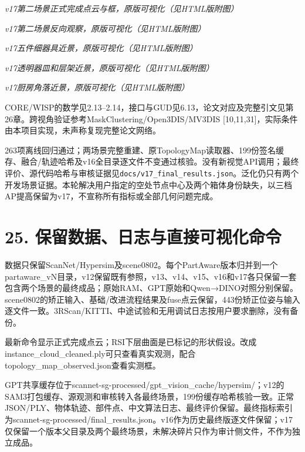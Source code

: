 \documentclass[UTF8,fontset=fandol]{ctexart}
\begin{document}
\textit{v17第二场景正式完成点云与框，原版可视化（见HTML版附图）}



\textit{v17第二场景反向观察，原版可视化（见HTML版附图）}



\textit{v17五件细器具近景，原版可视化（见HTML版附图）}



\textit{v17透明器皿和层架近景，原版可视化（见HTML版附图）}



\textit{v17厨房角落近景，原版可视化（见HTML版附图）}



CORE/WISP的数学见2.13–2.14，接口与GUD见6.13，论文对应及完整引文见第26章。跨视角验证参考MaskClustering/Open3DIS/MV3DIS [10,11,31]，实际条件由本项目实现，未声称复现完整论文网络。



263项离线回归通过；两场景完整重建、原TopologyMap读取器、199份签名缓存、融合/轨迹哈希及v16全目录逐文件不变通过核验。没有新视觉API调用；最终评价、源代码哈希与审核证据见\texttt{docs/\allowbreak{}v17\_\allowbreak{}final\_\allowbreak{}results.\allowbreak{}json}。泛化仍只有两个开发场景证据。本轮解决用户指定的空处节点中心及两个箱体身份缺失，以三档AP提高保留为v17，不宣称所有指标或全部几何问题完成。



\section*{25. 保留数据、日志与直接可视化命令}

数据只保留ScanNet/Hypersim及scene0802。每个PartAware版本归并到一个partaware\_vN目录，v12保留既有参照，v13、v14、v15、v16和v17各只保留一套包含两个场景的最终成品；原始RAM、GPT原始和Qwen→DINO对照分别保留。scene0802的矫正输入、基础/改进流程结果及fuse点云保留，443份矫正位姿与输入逐文件一致。3RScan/KITTI、中途试验和无用调试日志按用户要求删除，没有备份。



最新命令显示正式完成点云；RSI下层曲面是已标记的形状假设。改成instance\_cloud\_cleaned.ply可只查看真实观测，配合topology\_map\_observed.json查看实测框。



GPT共享缓存位于scannet-sg-processed/gpt\_vision\_cache/hypersim/；v12的SAM3打包缓存、源观测和审核转入各最终场景，199份缓存哈希核验一致。正常JSON/PLY、物体轨迹、部件点、中文算法日志、最终评价保留。最终指标索引为scannet-sg-processed/final\_results.json。v16作为历史最终版逐文件保留；v17仅保留一个版本父目录及两个最终场景，未解决碎片只作为审计侧文件，不作为独立成品。
\end{document}
